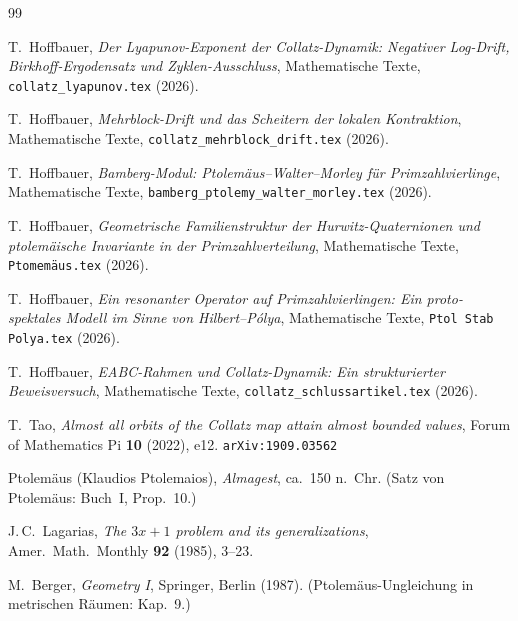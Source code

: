\documentclass[12pt,a4paper]{article}
\begin{document}
\begin{thebibliography}{99}

T.\ Hoffbauer,
\textit{Der Lyapunov-Exponent der Collatz-Dynamik: Negativer Log-Drift,
  Birkhoff-Ergodensatz und Zyklen-Ausschluss},
Mathematische Texte, \texttt{collatz\_lyapunov.tex} (2026).

T.\ Hoffbauer,
\textit{Mehrblock-Drift und das Scheitern der lokalen Kontraktion},
Mathematische Texte, \texttt{collatz\_mehrblock\_drift.tex} (2026).

T.\ Hoffbauer,
\textit{Bamberg-Modul: Ptolemäus--Walter--Morley für Primzahlvierlinge},
Mathematische Texte, \texttt{bamberg\_ptolemy\_walter\_morley.tex} (2026).

T.\ Hoffbauer,
\textit{Geometrische Familienstruktur der Hurwitz-Quaternionen und
  ptolemäische Invariante in der Primzahlverteilung},
Mathematische Texte, \texttt{Ptomemäus.tex} (2026).

T.\ Hoffbauer,
\textit{Ein resonanter Operator auf Primzahlvierlingen: Ein proto-spektales
  Modell im Sinne von Hilbert--Pólya},
Mathematische Texte, \texttt{Ptol Stab Polya.tex} (2026).

T.\ Hoffbauer,
\textit{EABC-Rahmen und Collatz-Dynamik: Ein strukturierter Beweisversuch},
Mathematische Texte, \texttt{collatz\_schlussartikel.tex} (2026).

T.\ Tao,
\textit{Almost all orbits of the Collatz map attain almost bounded values},
Forum of Mathematics Pi \textbf{10} (2022), e12.
\texttt{arXiv:1909.03562}

Ptolemäus (Klaudios Ptolemaios),
\textit{Almagest}, ca.\ 150 n.\ Chr.
(Satz von Ptolemäus: Buch~I, Prop.~10.)

J.\,C.\ Lagarias,
\textit{The $3x+1$ problem and its generalizations},
Amer.\ Math.\ Monthly \textbf{92} (1985), 3--23.

M.\ Berger,
\textit{Geometry I},
Springer, Berlin (1987).
(Ptolemäus-Ungleichung in metrischen Räumen: Kap.~9.)

\end{thebibliography}
\end{document}
